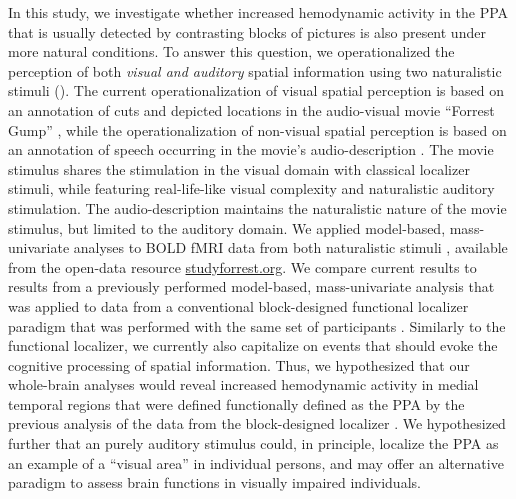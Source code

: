 \documentclass[english,11pt]{article}
\begin{document}
In this study, we investigate whether increased hemodynamic activity in the PPA
that is usually detected by contrasting blocks of pictures is also present under
more natural conditions.
To answer this question, we operationalized the perception of both
\textit{visual and auditory} spatial information using two naturalistic stimuli
(\citep[see reviews][]{hamilton2018revolution, hasson2008neurocinematics,
sonkusare2019naturalistic}).
The current operationalization of visual spatial perception is based on an
annotation of cuts and depicted locations in the audio-visual movie ``Forrest
Gump'' \citep{haeusler2016cutanno}, while
the operationalization of non-visual spatial perception is based on an
annotation of speech occurring in the movie's audio-description
\citep{haeusler2021studyforrest}.
The movie stimulus shares the stimulation in the visual domain with classical
localizer stimuli, while featuring real-life-like visual complexity and
naturalistic auditory stimulation. The audio-description maintains the
naturalistic nature of the movie stimulus, but limited to the auditory domain.
We applied model-based, mass-univariate analyses to BOLD fMRI data from both
naturalistic stimuli \citep{hanke2016simultaneous, hanke2014audiomovie},
available from the open-data resource
\href{http://www.studyforrest.org}{studyforrest.org}.
We compare current results to results from a previously performed model-based,
mass-univariate analysis that was applied to data from a conventional
block-designed functional localizer paradigm that was performed with the same
set of participants \citep{sengupta2016extension}.
Similarly to the functional localizer, we currently also capitalize on events
that should evoke the cognitive processing of spatial information.
Thus, we hypothesized that our whole-brain analyses would reveal increased
hemodynamic activity in medial temporal regions that were defined functionally
defined as the PPA by the previous analysis of the data from the block-designed
localizer \citep{sengupta2016extension}.
We hypothesized further that an purely auditory stimulus could, in principle,
localize the PPA as an example of a ``visual area'' in individual persons,
and may offer an alternative paradigm to assess brain functions in visually
impaired individuals.
\end{document}
